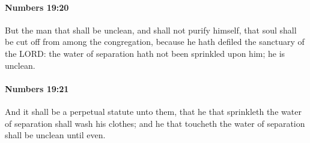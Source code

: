 		\paragraph{Numbers 19:20} %
			\label{NUMBERS-19-20}

			But the man that shall be unclean, and shall not purify himself, that soul shall be cut off from among the congregation, because he hath defiled the sanctuary of the LORD: the water of separation hath not been sprinkled upon him; he is unclean.


		\paragraph{Numbers 19:21} %
			\label{NUMBERS-19-21}

			And it shall be a perpetual statute unto them, that he that sprinkleth the water of separation shall wash his clothes; and he that toucheth the water of separation shall be unclean until even.

